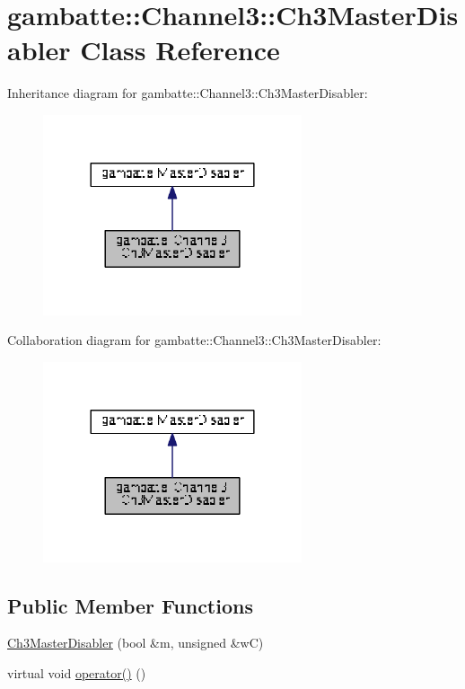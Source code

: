 \hypertarget{classgambatte_1_1Channel3_1_1Ch3MasterDisabler}{}\section{gambatte\+:\+:Channel3\+:\+:Ch3\+Master\+Disabler Class Reference}
\label{classgambatte_1_1Channel3_1_1Ch3MasterDisabler}


Inheritance diagram for gambatte\+:\+:Channel3\+:\+:Ch3\+Master\+Disabler\+:
\nopagebreak
\begin{figure}[H]
\begin{center}
\leavevmode
\includegraphics[width=216pt]{classgambatte_1_1Channel3_1_1Ch3MasterDisabler__inherit__graph}
\end{center}
\end{figure}


Collaboration diagram for gambatte\+:\+:Channel3\+:\+:Ch3\+Master\+Disabler\+:
\nopagebreak
\begin{figure}[H]
\begin{center}
\leavevmode
\includegraphics[width=216pt]{classgambatte_1_1Channel3_1_1Ch3MasterDisabler__coll__graph}
\end{center}
\end{figure}
\subsection*{Public Member Functions}
\begin{DoxyCompactItemize}
\item 
\hyperlink{classgambatte_1_1Channel3_1_1Ch3MasterDisabler_a315e8dbc0510e40c248b922c16143196}{Ch3\+Master\+Disabler} (bool \&m, unsigned \&wC)
\item 
virtual void \hyperlink{classgambatte_1_1Channel3_1_1Ch3MasterDisabler_aa8b79b7238fc3249d6a5bb0d64aa43d1}{operator()} ()
\end{DoxyCompactItemize}
